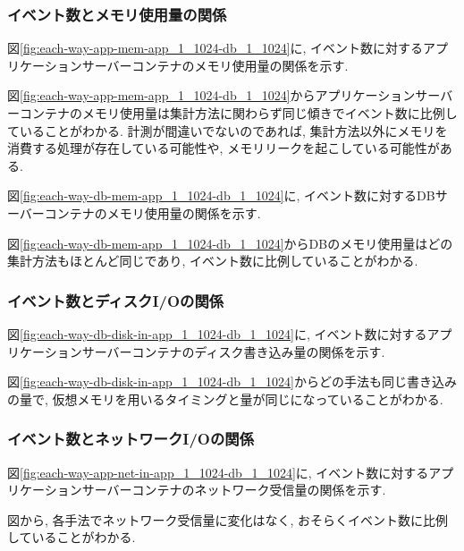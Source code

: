 \documentclass[../../../../main]{subfiles}
\begin{document}
    \subsubsection{イベント数とメモリ使用量の関係}\label{subsubsubsec:result-each-way-only-limit-mem}

    図\ref{fig:each-way-app-mem-app_1_1024-db_1_1024}に, イベント数に対するアプリケーションサーバーコンテナのメモリ使用量の関係を示す.

    

    図\ref{fig:each-way-app-mem-app_1_1024-db_1_1024}からアプリケーションサーバーコンテナのメモリ使用量は集計方法に関わらず同じ傾きでイベント数に比例していることがわかる. 計測が間違いでないのであれば, 集計方法以外にメモリを消費する処理が存在している可能性や, メモリリークを起こしている可能性がある.

    図\ref{fig:each-way-db-mem-app_1_1024-db_1_1024}に, イベント数に対するDBサーバーコンテナのメモリ使用量の関係を示す.

    

    図\ref{fig:each-way-db-mem-app_1_1024-db_1_1024}からDBのメモリ使用量はどの集計方法もほとんど同じであり, イベント数に比例していることがわかる.

    \subsubsection{イベント数とディスクI/Oの関係}\label{subsubsubsec:result-each-way-only-limit-disk-io}

    図\ref{fig:each-way-db-disk-in-app_1_1024-db_1_1024}に, イベント数に対するアプリケーションサーバーコンテナのディスク書き込み量の関係を示す.

    

    図\ref{fig:each-way-db-disk-in-app_1_1024-db_1_1024}からどの手法も同じ書き込みの量で, 仮想メモリを用いるタイミングと量が同じになっていることがわかる.

    \subsubsection{イベント数とネットワークI/Oの関係}\label{subsubsubsec:result-each-way-only-limit-net-io}

    図\ref{fig:each-way-app-net-in-app_1_1024-db_1_1024}に, イベント数に対するアプリケーションサーバーコンテナのネットワーク受信量の関係を示す.

    

    図から, 各手法でネットワーク受信量に変化はなく, おそらくイベント数に比例していることがわかる.
\end{document}
